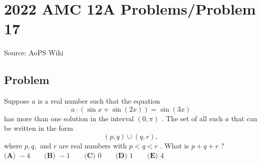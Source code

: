 \documentclass[12pt]{article}
\begin{document}
\section*{{2022 AMC 12A Problems/Problem 17}}
Source: AoPS Wiki

\subsection*{Problem}
Suppose $a$ is a real number such that the equation \[a\cdot(\sin{x}+\sin{(2x)}) = \sin{(3x)}\] has more than one solution in the interval $(0, \pi)$ . The set of all such $a$ that can be written
in the form \[(p,q) \cup (q,r),\] where $p, q,$ and $r$ are real numbers with $p < q< r$ . What is $p+q+r$ ? $\textbf{(A) } {-}4 \qquad \textbf{(B) } {-}1 \qquad \textbf{(C) } 0 \qquad \textbf{(D) } 1 \qquad \textbf{(E) } 4$
\end{document}

